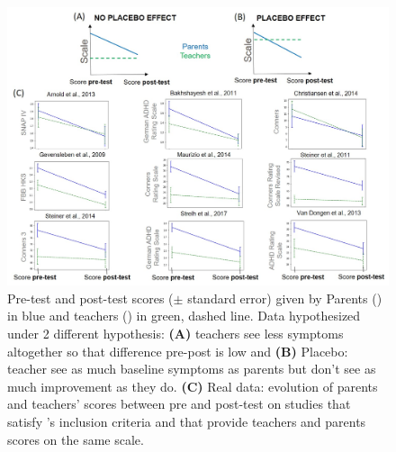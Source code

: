 \begin{figure}[h!]
  \centering
  \includegraphics[width=1.0\linewidth]{figures/discussion_on_placebo_effect_colors_2-columns_fitting_image.jpg}
  \caption{Pre-test and post-test scores ($\pm$ standard error) given by Parents () in blue and teachers () in green, dashed line. 
	Data hypothesized under 2 different hypothesis: \textbf{(A)} teachers see less symptoms altogether so that difference pre-post is low and \textbf{(B)}
	Placebo: teacher see as much baseline symptoms as parents but don't see as much improvement as they do. \textbf{(C)} Real data: evolution of parents 
	and teachers' scores between pre and post-test on studies that satisfy \citeauthor{Cortese2016}'s inclusion criteria and that provide teachers and parents
	scores on the same scale.}
  \label{Figure:discussion_on_placebo_effect_colors_2-columns_fitting_image}
\end{figure} 
